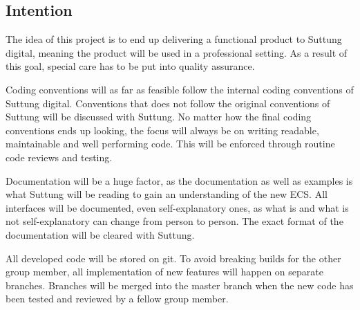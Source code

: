 \subsection{Intention}
The idea of this project is to end up delivering a functional product to Suttung digital,
meaning the product will be used in a professional setting.
As a result of this goal, special care has to be put into quality assurance.

Coding conventions will as far as feasible follow the internal coding conventions of Suttung digital.
Conventions that does not follow the original conventions of Suttung will be discussed with Suttung.
No matter how the final coding conventions ends up looking, the focus will always be on writing
readable, maintainable and well performing code.
This will be enforced through routine code reviews and testing.

Documentation will be a huge factor, as the documentation as well as examples is what 
Suttung will be reading to gain an understanding of the new ECS. 
All interfaces will be documented, even self-explanatory ones, as what is and what is not
self-explanatory can change from person to person.
The exact format of the documentation will be cleared with Suttung.

All developed code will be stored on git. 
To avoid breaking builds for the other group member,
all implementation of new features will happen on separate branches.
Branches will be merged into the master branch when the new code has been tested and reviewed 
by a fellow group member.